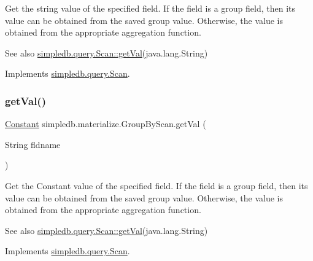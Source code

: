 Get the string value of the specified field. If the field is a group field, then its value can be obtained from the saved group value. Otherwise, the value is obtained from the appropriate aggregation function. \begin{DoxySeeAlso}{See also}
\hyperlink{interfacesimpledb_1_1query_1_1Scan_aca80bca2857c983a88834bf6c01ee5ca}{simpledb.\+query.\+Scan\+::get\+Val}(java.\+lang.\+String) 
\end{DoxySeeAlso}


Implements \hyperlink{interfacesimpledb_1_1query_1_1Scan_a922e219fee53ecfa6163525f9e3ef222}{simpledb.\+query.\+Scan}.

\mbox{\label{classsimpledb_1_1materialize_1_1GroupByScan_acb46660cae0539050eb6041f6310425f}} 
\subsubsection{\texorpdfstring{get\+Val()}{getVal()}}
{\footnotesize\ttfamily \hyperlink{classsimpledb_1_1query_1_1Constant}{Constant} simpledb.\+materialize.\+Group\+By\+Scan.\+get\+Val (\begin{DoxyParamCaption}\item[{String}]{fldname }\end{DoxyParamCaption})\hspace{0.3cm}{\ttfamily [inline]}}

Get the Constant value of the specified field. If the field is a group field, then its value can be obtained from the saved group value. Otherwise, the value is obtained from the appropriate aggregation function. \begin{DoxySeeAlso}{See also}
\hyperlink{interfacesimpledb_1_1query_1_1Scan_aca80bca2857c983a88834bf6c01ee5ca}{simpledb.\+query.\+Scan\+::get\+Val}(java.\+lang.\+String) 
\end{DoxySeeAlso}


Implements \hyperlink{interfacesimpledb_1_1query_1_1Scan_aca80bca2857c983a88834bf6c01ee5ca}{simpledb.\+query.\+Scan}.

\mbox{\label{classsimpledb_1_1materialize_1_1GroupByScan_aeff4514ccf6106445de717b20ec3d155}} 
